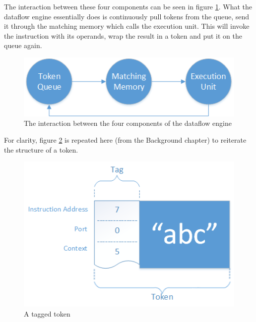 The interaction between these four components can be seen in figure \ref{fig:engine-architecture-tokenprocessing}. 
What the dataflow engine essentially does is continuously pull tokens from the queue, send it through the matching memory which calls the execution unit. This will invoke the instruction with its operands, wrap the result in a token and put it on the queue again. 

\begin{figure}[h!]
	\includegraphics[width=\textwidth]{images/Engine-Architecture-TokenProcessing.png}
	\caption{The interaction between the four components of the dataflow engine}
	\label{fig:engine-architecture-tokenprocessing}
\end{figure}

\newpage

For clarity, figure \ref{fig:background-dataflow-token-again} is repeated here (from the Background chapter) to reiterate the structure of a token. 

\begin{figure}[ht]
	\centerline{\includegraphics[width=\textwidth]{images/background-dataflow-token.png}}
	\caption{A tagged token}
	\label{fig:background-dataflow-token-again}
\end{figure}


